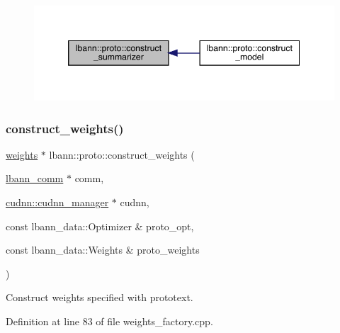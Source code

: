 \begin{figure}[H]
\begin{center}
\leavevmode
\includegraphics[width=346pt]{namespacelbann_1_1proto_abf0988db9cd58f9ef013588b440c14bd_icgraph}
\end{center}
\end{figure}
\mbox{\label{namespacelbann_1_1proto_a1e95259d3e7fd20a9c361850940a398a}} 
\subsubsection{\texorpdfstring{construct\+\_\+weights()}{construct\_weights()}}
{\footnotesize\ttfamily \hyperlink{classlbann_1_1weights}{weights} $\ast$ lbann\+::proto\+::construct\+\_\+weights (\begin{DoxyParamCaption}\item[{\hyperlink{classlbann_1_1lbann__comm}{lbann\+\_\+comm} $\ast$}]{comm,  }\item[{\hyperlink{classlbann_1_1cudnn_1_1cudnn__manager}{cudnn\+::cudnn\+\_\+manager} $\ast$}]{cudnn,  }\item[{const lbann\+\_\+data\+::\+Optimizer \&}]{proto\+\_\+opt,  }\item[{const lbann\+\_\+data\+::\+Weights \&}]{proto\+\_\+weights }\end{DoxyParamCaption})}

Construct weights specified with prototext. 

Definition at line 83 of file weights\+\_\+factory.\+cpp.


